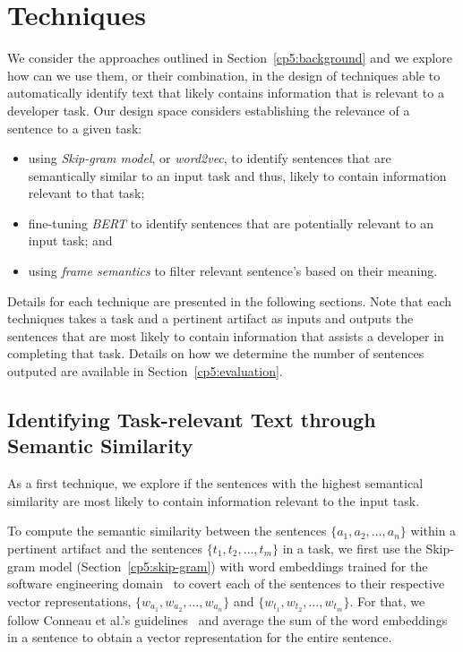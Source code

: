 \section{Techniques}
\label{cp5:approaches}




We consider the approaches outlined in Section~\ref{cp5:background} and we explore 
how can we use them, or their combination, in the design of techniques able to automatically identify text that likely contains information that is relevant to a developer task. 
Our design space considers establishing the relevance of a sentence to a given task:

\begin{itemize}
    \item using \textit{Skip-gram model}, or \textit{word2vec}, to identify sentences that are semantically similar to an input task and thus, likely to contain information relevant to that task;
    
    \item fine-tuning \textit{BERT} to identify sentences that are potentially relevant to an input task; and

    \item using \textit{frame semantics} to filter relevant sentence's based on their meaning.
\end{itemize}


Details for each technique are presented in the following sections.
Note that each techniques takes a task and a pertinent artifact as inputs and outputs the sentences 
that are most likely to contain information that assists a developer in completing that task. 
Details on how we determine the number of sentences outputed are available in Section~\ref{cp5:evaluation}.



\subsection{Identifying Task-relevant Text through Semantic Similarity}



As a first technique, we explore if the sentences with the highest semantical similarity are most likely to contain information relevant to the input task.


To compute the semantic similarity between the sentences $\{a_1, a_2, \dots, a_n\}$ within a pertinent artifact and the sentences $\{t_1, t_2, \dots, t_m\}$ in a task,
we first
 use the Skip-gram model (Section~\ref{cp5:skip-gram}) with word embeddings trained for the software engineering domain~\cite{Efstathiou2018} to covert each of the sentences to their respective vector representations, $\{ w_{a_1}, w_{a_2}, \dots, w_{a_n}\}$ and $\{ w_{t_1}, w_{t_2}, \dots, w_{t_m}\}$. For that, we follow Conneau et al.'s guidelines~\cite{conneau2018} 
 and average the sum of the word embeddings in a sentence to obtain a vector representation for the entire sentence.


